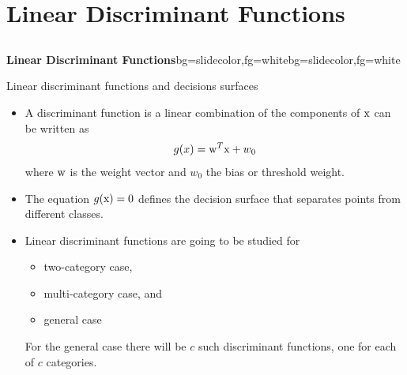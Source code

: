 \section{Linear Discriminant Functions}
\subsection{}
\begin{frame}{}
\begin{variableblock}{\centering \Large \textbf{\vspace{4pt}\newline Linear Discriminant Functions\vspace{4pt}}}{bg=slidecolor,fg=white}{bg=slidecolor,fg=white}
\end{variableblock}
\end{frame}

\begin{frame}{Linear discriminant functions and decisions surfaces}
\begin{itemize}
\item A {\color{mycolor1}discriminant function} is a linear combination of the components of ${\rm x}$ can be written as
\begin{equation}
g(x)={\rm w}^T{\rm x}+w_0 \nonumber
\end{equation}
where ${\rm w}$ is the {\color{mycolor2}weight vector} and $w_0$ the {\color{mycolor4}bias} or {\color{mycolor4}threshold} weight.
\item The equation $g({\rm x}) = 0$ defines the {\color{mycolor1}decision surface} that separates points from different classes.
\item Linear discriminant functions are going to be studied for 
\begin{itemize}
\item two-category case,
\item multi-category case, and
\item general case
\end{itemize} 
For the general case
there will be $c$ such discriminant functions, one for each of $c$ categories.\nocite{duda2012pattern}
\end{itemize}
\end{frame}

